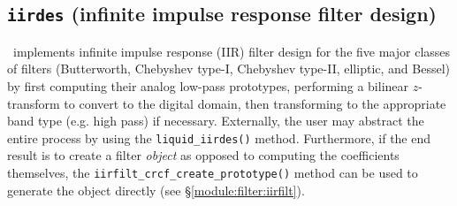 % 
%
\subsection{{\tt iirdes} (infinite impulse response filter design)}
\label{module:filter:iirdes}
\liquid\ implements infinite impulse response (IIR) filter design for the
five major classes of filters
(Butterworth, Chebyshev type-I, Chebyshev type-II, elliptic, and Bessel)
by
first computing their analog low-pass prototypes, performing a bilinear
$z$-transform to convert to the digital domain, then transforming to the
appropriate band type (e.g. high pass) if necessary.
Externally, the user may abstract the entire process by using the
{\tt liquid\_iirdes()} method.
Furthermore, if the end result is to create a filter {\em object} as
opposed to computing the coefficients themselves, the
{\tt iirfilt\_crcf\_create\_prototype()} method can be used to generate
the object directly
(see \S\ref{module:filter:iirfilt}).

